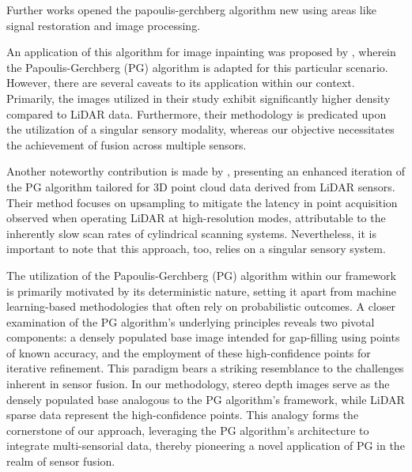 \documentclass[conference]{IEEEtran}
\begin{document}
Further works opened the papoulis-gerchberg algorithm new using areas like signal restoration and image processing.

An application of this algorithm for image inpainting was proposed by \cite{pg-image-inpaint-2009}, wherein the Papoulis-Gerchberg (PG) algorithm is adapted for this particular scenario. However, there are several caveats to its application within our context. Primarily, the images utilized in their study exhibit significantly higher density compared to LiDAR data. Furthermore, their methodology is predicated upon the utilization of a singular sensory modality, whereas our objective necessitates the achievement of fusion across multiple sensors.

Another noteworthy contribution is made by \cite{ozbay2015high}, presenting an enhanced iteration of the PG algorithm tailored for 3D point cloud data derived from LiDAR sensors. Their method focuses on upsampling to mitigate the latency in point acquisition observed when operating LiDAR at high-resolution modes, attributable to the inherently slow scan rates of cylindrical scanning systems. Nevertheless, it is important to note that this approach, too, relies on a singular sensory system.

The utilization of the Papoulis-Gerchberg (PG) algorithm within our framework is primarily motivated by its deterministic nature, setting it apart from machine learning-based methodologies that often rely on probabilistic outcomes. A closer examination of the PG algorithm's underlying principles reveals two pivotal components: a densely populated base image intended for gap-filling using points of known accuracy, and the employment of these high-confidence points for iterative refinement. This paradigm bears a striking resemblance to the challenges inherent in sensor fusion. In our methodology, stereo depth images serve as the densely populated base analogous to the PG algorithm's framework, while LiDAR sparse data represent the high-confidence points. This analogy forms the cornerstone of our approach, leveraging the PG algorithm's architecture to integrate multi-sensorial data, thereby pioneering a novel application of PG in the realm of sensor fusion.
\end{document}
